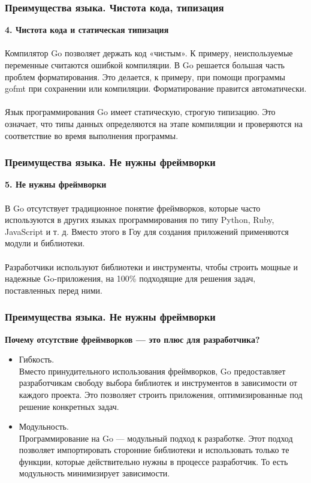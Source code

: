 \documentclass{beamer}
\begin{document}
\begin{frame}[fragile] \frametitle{Преимущества языка. Чистота кода, типизация}
  \textbf{4. Чистота кода и статическая типизация}
  \\\\
  Компилятор Go позволяет держать код «чистым». К примеру, неиспользуемые
  переменные считаются ошибкой компиляции. В Go решается большая часть проблем
  форматирования. Это делается, к примеру, при помощи программы gofmt при
  сохранении или компиляции. Форматирование правится автоматически.
  \\\\
  Язык программирования Go имеет статическую, строгую типизацию. Это означает,
  что типы данных определяются на этапе компиляции и проверяются на соответствие
  во время выполнения программы.
\end{frame}
\begin{frame}[fragile] \frametitle{Преимущества языка. Не нужны фреймворки}
  \textbf{5. Не нужны фреймворки}
  \\\\
  В Go отсутствует традиционное понятие фреймворков, которые часто используются
  в других языках программирования по типу Python, Ruby, JavaScript и т. д.
  Вместо этого в Гоу для создания приложений применяются модули и библиотеки.
  \\\\ 
  Разработчики используют библиотеки и инструменты, чтобы строить мощные и
  надежные Go-приложения, на 100\% подходящие для решения задач, поставленных
  перед ними.
\end{frame}
\begin{frame}[fragile] \frametitle{Преимущества языка. Не нужны фреймворки}
  \textbf{Почему отсутствие фреймворков — это плюс для разработчика?}
  \begin{itemize}
    \item Гибкость.
    \\
    Вместо принудительного использования фреймворков, Go предоставляет
    разработчикам свободу выбора библиотек и инструментов в зависимости от
    каждого проекта. Это позволяет строить приложения, оптимизированные под
    решение конкретных задач.
    \item Модульность. 
    \\
    Программирование на Go — модульный подход к разработке. Этот подход
    позволяет импортировать сторонние библиотеки и использовать только те
    функции, которые действительно нужны в процессе разработчик. То есть
    модульность минимизирует зависимости. 
  \end{itemize}
\end{frame}
\end{document}
